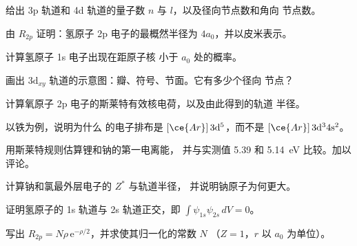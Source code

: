 \begin{exercise}[$\star$]\label{exo:b2:atomic-orbitals:1}
给出 3p 轨道和 4d 轨道的量子数 $n$ 与 $l$，以及径向节点数和角向
节点数。
\end{exercise}

\begin{exercise}[$\star$]\label{exo:b2:atomic-orbitals:2}
由 $R_{2p}$ 证明：氢原子 2p 电子的最概然半径为
$4a_0$，并以皮米表示。
\end{exercise}

\begin{exercise}[$\star$]\label{exo:b2:atomic-orbitals:3}
计算氢原子 1s 电子出现在距原子核
小于 $a_0$ 处的概率。
\end{exercise}

\begin{exercise}[$\star$]\label{exo:b2:atomic-orbitals:4}
画出 $3\mathrm d_{xy}$ 轨道的示意图：瓣、符号、节面。它有多少个径向
节点？
\end{exercise}

\begin{exercise}[$\star\star$]\label{exo:b2:atomic-orbitals:5}
计算氧原子 2p 电子的斯莱特有效核电荷，以及由此得到的轨道
半径。
\end{exercise}

\begin{exercise}[$\star\star$]\label{exo:b2:atomic-orbitals:6}
以铁为例，说明为什么  的电子排布是
$[\ce{Ar}]\,3\mathrm d^5$，而不是 $[\ce{Ar}]\,3\mathrm d^3 4\mathrm s^2$。
\end{exercise}

\begin{exercise}[$\star\star$]\label{exo:b2:atomic-orbitals:7}
用斯莱特规则估算锂和钠的第一电离能，
并与实测值 5.39 和 \qty{5.14}{eV} 比较。加以评论。
\end{exercise}

\begin{exercise}[$\star\star$]\label{exo:b2:atomic-orbitals:8}
计算钠和氯最外层电子的 $Z^*$ 与轨道半径，
并说明钠原子为何更大。
\end{exercise}

\begin{exercise}[$\star\star$]\label{exo:b2:atomic-orbitals:9}
证明氢原子的 1s 轨道与 2s 轨道正交，即
$\int\psi_{1s}\psi_{2s}\,dV = 0$。
\end{exercise}

\begin{exercise}[$\star\star\star$]\label{exo:b2:atomic-orbitals:10}
写出 $R_{2p} = N\rho\,\mathrm e^{-\rho/2}$，并求使其归一化的常数 $N$
（$Z = 1$，$r$ 以 $a_0$ 为单位）。
\end{exercise}

